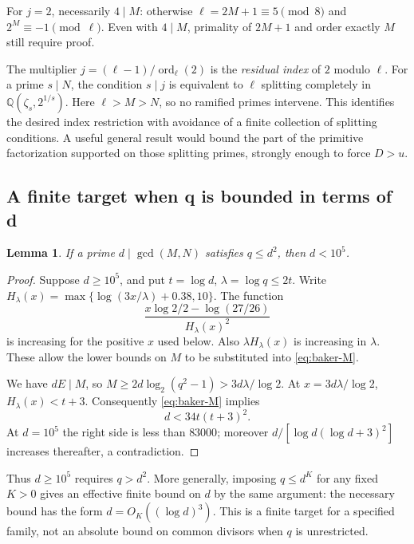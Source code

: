 \documentclass[11pt]{article}
\newtheorem{lemma}{Lemma}
\begin{document}
For $j=2$, necessarily $4\mid M$: otherwise $\ell=2M+1\equiv5\pmod8$
and $2^M\equiv-1\pmod\ell$.
Even with $4\mid M$, primality of $2M+1$ and order exactly $M$
still require proof.

The multiplier $j=(\ell-1)/\operatorname{ord}_\ell(2)$ is the
\emph{residual index} of $2$ modulo $\ell$.
For a prime $s\mid N$, the condition $s\mid j$ is equivalent to
$\ell$ splitting completely in $\mathbb Q(\zeta_s,2^{1/s})$.
Here $\ell>M>N$, so no ramified primes intervene.
This identifies the desired index restriction with avoidance of a
finite collection of splitting conditions. A useful general result
would bound the part of the primitive factorization supported on
those splitting primes, strongly enough to force $D>u$.

\subsection{A finite target when q is bounded in terms of d}
\begin{lemma}
If a prime $d\mid\gcd(M,N)$ satisfies $q\le d^2$, then $d<10^5$.
\end{lemma}
\begin{proof}
Suppose $d\ge10^5$, and put $t=\log d$, $\lambda=\log q\le2t$.
Write $H_\lambda(x)=\max\{\log(3x/\lambda)+0.38,10\}$.
The function
\[
\frac{x\log2/2-\log(27/26)}{H_\lambda(x)^2}
\]
is increasing for the positive $x$ used below. Also
$\lambda H_\lambda(x)$ is increasing in $\lambda$.
These allow the lower bounds on $M$ to be substituted into
\eqref{eq:baker-M}.

We have $dE\mid M$, so
$M\ge2d\log_2(q^2-1)>3d\lambda/\log2$.
At $x=3d\lambda/\log2$, $H_\lambda(x)<t+3$.
Consequently \eqref{eq:baker-M} implies
\[
d<34t(t+3)^2.
\]
At $d=10^5$ the right side is less than $83000$; moreover
$d/[\log d(\log d+3)^2]$ increases thereafter, a contradiction.
\end{proof}
Thus $d\ge10^5$ requires $q>d^2$. More generally, imposing
$q\le d^K$ for any fixed $K>0$ gives an effective finite bound
on $d$ by the same argument: the necessary bound has the form
$d=O_K((\log d)^3)$.
This is a finite target for a specified family, not an absolute bound
on common divisors when $q$ is unrestricted.
\end{document}
